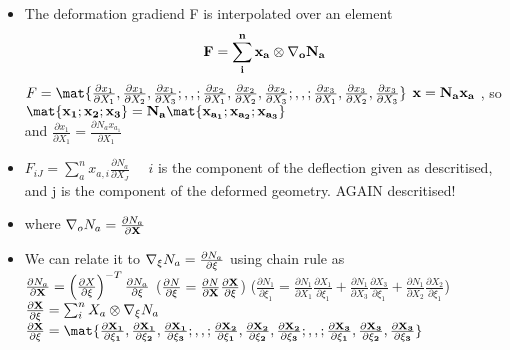 	\begin{frame}
		\begin{itemize}
			\item  The deformation gradiend F is interpolated over an element
			\begin{equation}
			\mathbf{F = \sum_{i}^{n}x_a \otimes \nabla_o N_a}
			\end{equation}
			$F = \mat{\frac{\partial x_1}{\partial X_1},\frac{\partial x_1}{\partial X_2},\frac{\partial x_1}{\partial X_3} ; , , ;
					  \frac{\partial x_2}{\partial X_1},\frac{\partial x_2}{\partial X_2},\frac{\partial x_2}{\partial X_3}; , , ;
				  	  \frac{\partial x_3}{\partial X_1},\frac{\partial x_3}{\partial X_2},\frac{\partial x_3}{\partial X_3}}$
			\qquad $\mathbf{x = N_ax_a}$ , so $\ve{\mat{x_1;x_2;x_3} = N_a\mat{x_{a_1};x_{a_2} ;x_{a_3} }}$ 			\\ and $\frac{\partial x_1}{\partial X_1} =  \frac{\partial N_a x_{a_1}}{\partial X_1}$
			\item $F_{iJ} = \sum_{a}^{n} x_{a,i} \frac{\partial N_a}{\partial X_J} \quad$ $i$ is the component of the deflection given as descritised, and j is the component of the deformed geometry. AGAIN descritised! 
			\item where $\nabla_o N_a = \frac{\partial N_a}{\partial \mathbf{X}}$ 
			\item We can relate it to $\nabla_{\xi} N_a = \frac{\partial N_a}{\partial \mathbf{\xi}}$ using chain rule as\\
			$\frac{\partial N_a}{\partial \mathbf{X}} = \left(\frac{\partial X}{\partial \mathbf{\xi}} \right)^{-T}\frac{\partial N_a}{\partial \mathbf{\xi}}$ \qquad ($\frac{\partial N}{\partial \xi} = \frac{\partial N}{\partial \mathbf{X}}\frac{\partial \mathbf{X}}{\partial \xi}$) \qquad ($\frac{\partial N_1}{\partial \xi_1} = \frac{\partial N_1}{\partial X_1}\frac{\partial X_1}{\partial \xi_1} + \frac{\partial N_1}{\partial X_3}\frac{\partial X_3}{\partial \xi_1}+ \frac{\partial N_1}{\partial X_2}\frac{\partial X_2}{\partial \xi_1}$) \\ 
			$\frac{\partial \mathbf{X}}{\partial \mathbf{\xi}} =  \sum_{i}^{n}X_a \otimes \nabla_{\xi} N_a$ 
			\qquad  \qquad 
			$\ve{\frac{\partial X}{\partial \xi} = \mat{\frac{\partial X_1}{\partial \xi_1},\frac{\partial X_1}{\partial \xi_2},\frac{\partial X_1}{\partial \xi_3} ; , , ;
			\frac{\partial X_2}{\partial \xi_1},\frac{\partial X_2}{\partial \xi_2},\frac{\partial X_2}{\partial \xi_3}; , , ;
			\frac{\partial X_3}{\partial \xi_1},\frac{\partial X_3}{\partial \xi_2},\frac{\partial X_3}{\partial \xi_3}}}$

		\end{itemize}	\end{frame}
	
